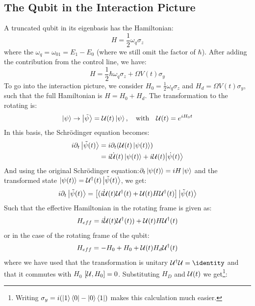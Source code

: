\subsection{The Qubit in the Interaction Picture}
A truncated qubit in its eigenbasis has the Hamiltonian:
\begin{equation}
    H = \frac{1}{2} \omega_{q} \sigma_z
\end{equation}
where the $\omega_q = \omega_{01} = E_1 - E_0$ (where we still omit the factor of $\hbar$). After adding the contribution from the control line, we have:
\begin{equation}
    H = \frac{1}{2} \hbar \omega_{q} \sigma_z + \Omega V(t) \sigma_y
\end{equation}
To go into the interaction picture, we consider $H_0 = \frac{1}{2} \omega_{q} \sigma_z$ and $H_d = \Omega V(t) \sigma_y$, such that the full Hamiltonian is $H = H_0 + H_d$. The transformation to the rotating is:
\begin{equation}
    \ket{\psi} \to \ket{\tilde{\psi}} = \mathcal{U}(t)\ket{\psi}, \quad \text{with}\quad \mathcal{U}(t) = e^{iH_0 t}
\end{equation}
In this basis, the Schrödinger equation becomes:
\begin{align*}
    i\partial_t \ket{\tilde{\psi}(t)} &= i \partial_t (\mathcal{U}(t) \ket{{\psi}(t)}) \\
    &= i \dot{\mathcal{U}}(t)\ket{\psi(t)} + i \mathcal{U}(t) {\ket{\Dot{{\psi}}(t)}}
\end{align*}
And using the original Schrödinger equation:$\partial_t\ket{\psi(t)} = i H \ket{\psi}$ and the transformed state $\ket{\psi(t)} = \mathcal{U}^\dagger(t) \ket{\tilde{\psi}(t)}$, we get:
\begin{equation}
    i \partial_t \ket{\Tilde{\psi}(t)}= \left[(\dot{i \mathcal{U}}{(t)}\mathcal{U}^\dagger(t) + \mathcal{U}(t) H \mathcal{U}^\dagger(t)\right]\ket{\tilde{\psi}(t)}
\end{equation}
Such that the effective Hamiltonian in the rotating frame is given as:
\begin{equation}
    H_{eff} = \dot{i \mathcal{U}}{(t)}\mathcal{U}^\dagger(t)) + \mathcal{U}(t) H \mathcal{U}^\dagger(t)
\end{equation}
or in the case of the rotating frame of the qubit:
\begin{equation}
    H_{eff} = - H_0 + H_0 + \mathcal{U}(t) H_d \mathcal{U}^\dagger(t)
\end{equation}
where we have used that the transformation is unitary $\unitary^\dagger \unitary = \identity$ and that it commutes with $H_0$ $\comm{\unitary}{H_0} = 0$. Substituting $H_D$ and $\mathcal{U}(t)$ we get\footnote{Writing $\sigma_y = i (\ket{1}\bra{0} - \ket{0}\bra{1})$ makes this calculation much easier.}\cite{krantz_quantum_2019}:

